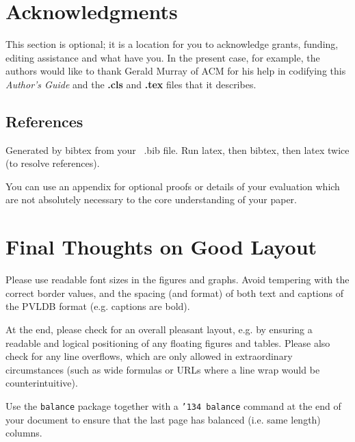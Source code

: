 \documentclass{vldb}
\begin{document}
\section{Acknowledgments}
This section is optional; it is a location for you
to acknowledge grants, funding, editing assistance and
what have you.  In the present case, for example, the
authors would like to thank Gerald Murray of ACM for
his help in codifying this \textit{Author's Guide}
and the \textbf{.cls} and \textbf{.tex} files that it describes.




\subsection{References}
Generated by bibtex from your ~.bib file.  Run latex,
then bibtex, then latex twice (to resolve references).


\begin{appendix}
You can use an appendix for optional proofs or details of your evaluation which are not absolutely necessary to the core understanding of your paper. 

\section{Final Thoughts on Good Layout}
Please use readable font sizes in the figures and graphs. Avoid tempering with the correct border values, and the spacing (and format) of both text and captions of the PVLDB format (e.g. captions are bold).

At the end, please check for an overall pleasant layout, e.g. by ensuring a readable and logical positioning of any floating figures and tables. Please also check for any line overflows, which are only allowed in extraordinary circumstances (such as wide formulas or URLs where a line wrap would be counterintuitive).

Use the \texttt{balance} package together with a \texttt{\char'134 balance} command at the end of your document to ensure that the last page has balanced (i.e. same length) columns.

\end{appendix}
\end{document}
